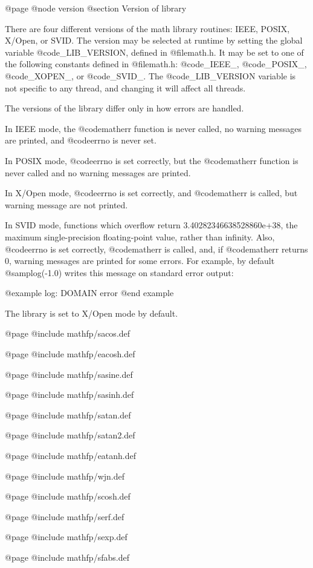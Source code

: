 @page
@node version
@section Version of library

There are four different versions of the math library routines: IEEE,
POSIX, X/Open, or SVID.  The version may be selected at runtime by
setting the global variable @code{_LIB_VERSION}, defined in
@file{math.h}.  It may be set to one of the following constants defined
in @file{math.h}: @code{_IEEE_}, @code{_POSIX_}, @code{_XOPEN_}, or
@code{_SVID_}.  The @code{_LIB_VERSION} variable is not specific to any
thread, and changing it will affect all threads.

The versions of the library differ only in how errors are handled.

In IEEE mode, the @code{matherr} function is never called, no warning
messages are printed, and @code{errno} is never set.

In POSIX mode, @code{errno} is set correctly, but the @code{matherr}
function is never called and no warning messages are printed.

In X/Open mode, @code{errno} is set correctly, and @code{matherr} is
called, but warning message are not printed.

In SVID mode, functions which overflow return 3.40282346638528860e+38,
the maximum single-precision floating-point value, rather than infinity.
Also, @code{errno} is set correctly, @code{matherr} is called, and, if
@code{matherr} returns 0, warning messages are printed for some errors.
For example, by default @samp{log(-1.0)} writes this message on standard
error output:

@example
log: DOMAIN error
@end example

The library is set to X/Open mode by default.

@page
@include mathfp/sacos.def

@page
@include mathfp/eacosh.def

@page
@include mathfp/sasine.def

@page
@include mathfp/sasinh.def

@page
@include mathfp/satan.def

@page
@include mathfp/satan2.def

@page
@include mathfp/eatanh.def

@page
@include mathfp/wjn.def

@page
@include mathfp/scosh.def

@page
@include mathfp/serf.def

@page
@include mathfp/sexp.def

@page
@include mathfp/sfabs.def

